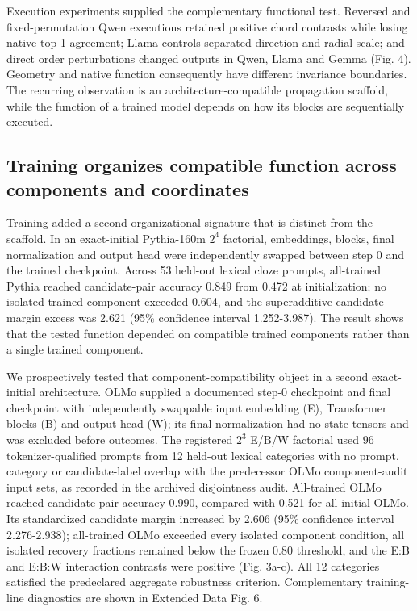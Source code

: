 \documentclass[12pt]{article}
\begin{document}
Execution experiments supplied the complementary functional test. Reversed and fixed-permutation Qwen executions retained positive chord contrasts while losing native top-1 agreement; Llama controls separated direction and radial scale; and direct order perturbations changed outputs in Qwen, Llama and Gemma (Fig. 4). Geometry and native function consequently have different invariance boundaries. The recurring observation is an architecture-compatible propagation scaffold, while the function of a trained model depends on how its blocks are sequentially executed.

\subsection*{Training organizes compatible function across components and coordinates}

Training added a second organizational signature that is distinct from the scaffold. In an exact-initial Pythia-160m \(2^4\) factorial, embeddings, blocks, final normalization and output head were independently swapped between step 0 and the trained checkpoint. Across 53 held-out lexical cloze prompts, all-trained Pythia reached candidate-pair accuracy 0.849 from 0.472 at initialization; no isolated trained component exceeded 0.604, and the superadditive candidate-margin excess was 2.621 (95\% confidence interval 1.252-3.987). The result shows that the tested function depended on compatible trained components rather than a single trained component.

We prospectively tested that component-compatibility object in a second exact-initial architecture. OLMo supplied a documented step-0 checkpoint and final checkpoint with independently swappable input embedding (E), Transformer blocks (B) and output head (W); its final normalization had no state tensors and was excluded before outcomes. The registered \(2^3\) E/B/W factorial used 96 tokenizer-qualified prompts from 12 held-out lexical categories with no prompt, category or candidate-label overlap with the predecessor OLMo component-audit input sets, as recorded in the archived disjointness audit. All-trained OLMo reached candidate-pair accuracy 0.990, compared with 0.521 for all-initial OLMo. Its standardized candidate margin increased by 2.606 (95\% confidence interval 2.276-2.938); all-trained OLMo exceeded every isolated component condition, all isolated recovery fractions remained below the frozen 0.80 threshold, and the E:B and E:B:W interaction contrasts were positive (Fig. 3a-c). All 12 categories satisfied the predeclared aggregate robustness criterion. Complementary training-line diagnostics are shown in Extended Data Fig. 6.
\end{document}
